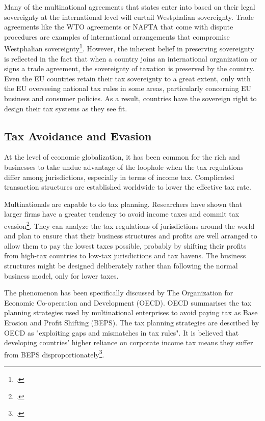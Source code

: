 Many of the multinational agreements that states enter into based on their legal sovereignty at the international level will curtail Westphalian sovereignty. Trade agreements like the WTO agreements or NAFTA that come with dispute procedures are examples of international arrangements that compromise Westphalian sovereignty\footcite[2110]{Dietsch2011}. 
However, the inherent belief in preserving sovereignty is reflected in the fact that when a country joins an international organization or signs a trade agreement, the sovereignty of taxation is preserved by the country.  Even the EU countries retain their tax sovereignty to a great extent, only with the EU overseeing national tax rules in some areas, particularly concerning EU business and consumer policies. As a result, countries have the sovereign right to design their tax systems as they see fit. 

\subsection{Tax Avoidance and Evasion}
At the level of economic globalization, it has been common for the rich and businesses to take undue advantage of the loophole when the tax regulations differ among jurisdictions, especially in terms of income tax. Complicated transaction structures are established worldwide to lower the effective tax rate. 

Multinationals are capable to do tax planning. Researchers have shown that larger firms have a greater tendency to avoid income taxes and commit tax evasion\footcite{Hoxhaj2022}. They can analyze the tax regulations of jurisdictions around the world and plan to ensure that their business structures and profits are well arranged to allow them to pay the lowest taxes possible, probably by shifting their profits from high-tax countries to low-tax jurisdictions and tax havens. 
The business structures might be designed deliberately rather than following the normal business model, only for lower taxes.

The phenomenon has been specifically discussed by The Organization for Economic Co-operation and Development (OECD). OECD summarises the tax planning strategies used by multinational enterprises to avoid paying tax as Base Erosion and Profit Shifting (BEPS). The tax planning strategies are described by OECD as "exploiting gaps and mismatches in tax rules". It is believed that developing countries' higher reliance on corporate income tax means they suffer from BEPS disproportionately\footcite{OECD_BEPS}.

